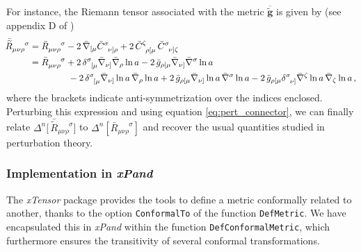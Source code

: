 \documentclass[notitlepage,onecolumn,floatfix,preprintnumbers,aps,prd,showpacs,nofootinbib,amsmath,amssymb,amsfonts]{revtex4-1}
\newcommand{\<}{\langle}
\renewcommand{\>}{\rangle}
\newcommand{\xPand}{{\em \lowercase{x}P\lowercase{and}}}
\begin{document}
For instance, the Riemann tensor associated with the metric $\overline{\widetilde{\bm g}}$ is given by 
(see appendix D of \cite{1984ucp..book.....W}) 
%
\begin{align}
	\bar{\! \widetilde{R}} {}_{\mu \nu \rho}^{\phantom{\mu \nu \rho} \sigma} 
		& = \bar{R}_{\mu \nu \rho}^{\phantom{\mu \nu \rho} \sigma} 
		- 2 \, \bar\nabla_{[ \mu} \bar C^\sigma_{\phantom{\sigma} \nu ] \rho} 
		+ 2 \, \bar C^{\zeta}_{\phantom{\zeta} \rho [ \mu} \, \bar C^{\sigma}_{\phantom{\sigma} \nu ] \zeta} \nonumber \\ 
		& = \bar R_{\mu \nu \rho}^{\phantom{\mu \nu \rho} \sigma} 
		+ 2 \, \delta^{\sigma}_{\phantom{\sigma} [ \mu} \bar\nabla_{\nu ]} \bar\nabla_\rho \ln a 
		- 2 \, \bar g_{\rho [ \mu} \bar\nabla_{\nu ]} \bar\nabla^\sigma \ln a \nonumber \\ 
		& \hspace{1.5cm} 
		- 2 \, \delta^{\sigma}_{\phantom{\sigma} [ \mu} \bar\nabla_{\nu ]} \ln a \, \bar\nabla_\rho \ln a 
		+ 2 \, \bar g_{\rho [ \mu} \bar\nabla_{\nu ]} \ln a \, \bar\nabla^\sigma \ln a 
		- 2 \, \bar g_{\rho [ \mu} \delta^{\sigma}_{\phantom{\sigma} \nu ]} \bar\nabla^\zeta \ln a \, \bar\nabla_\zeta \ln a \, , 
	\label{eq:riemann_back_phys}
\end{align}
%
where the brackets indicate anti-symmetrization over the indices enclosed. 
Perturbing this expression and using equation \eqref{eq:pert_connector}, we can finally relate 
$\Delta^{n}\big[ \, \bar{\! \widetilde{R}} {}_{\mu \nu \rho}^{\phantom{\mu \nu \rho}\sigma} \big]$ to $\Delta^{n}\left[\bar{R}{}_{\mu \nu \rho}^{\phantom{\mu \nu \rho} \sigma}\right]$ and recover the usual quantities studied in perturbation theory. 

\subsubsection{Implementation in \xPand}

The \textit{xTensor} package provides the tools to define a metric conformally related to another, 
thanks to the option {\tt ConformalTo} of the function {\tt DefMetric}. 
We have encapsulated this in \textit{xPand} within the function {\tt Def\-Conformal\-Metric}, 
which furthermore ensures the transitivity of several conformal transformations. 
\end{document}
